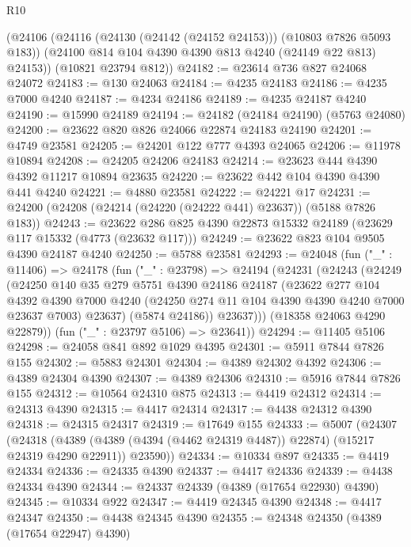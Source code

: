 \begin{lexlean}{R10}
\begin{coremodule}
      (@24106
        (@24116 (@24130 (@24142 (@24152 @24153))) (@10803 @7826 @5093 @183))
        (@24100 @814 @104 @4390 @4390 @813 @4240 (@24149 @22 @813) @24153))
      (@10821 @23794 @812))
@24182 := @23614 @736 @827 @24068 @24072
@24183 := @130 @24063
@24184 := @4235 @24183
@24186 := @4235 @7000 @4240
@24187 := @4234 @24186
@24189 := @4235 @24187 @4240
@24190 := @15990 @24189
@24194 := @24182 (@24184 @24190) (@5763 @24080)
@24200 := @23622 @820 @826 @24066 @22874 @24183 @24190
@24201 := @4749 @23581
@24205 := @24201 @122 @777 @4393 @24065
@24206 := @11978 @10894
@24208 := @24205 @24206 @24183
@24214 := @23623 @444 @4390 @4392 @11217 @10894 @23635
@24220 := @23622 @442 @104 @4390 @4390 @441 @4240
@24221 := @4880 @23581
@24222 := @24221 @17
@24231 := @24200 (@24208 (@24214 (@24220 (@24222 @441) @23637)) (@5188 @7826 @183))
@24243 := @23622 @286 @825 @4390 @22873 @15332 @24189 (@23629 @117 @15332 (@4773 (@23632 @117)))
@24249 := @23622 @823 @104 @9505 @4390 @24187 @4240
@24250 := @5788 @23581
@24293 := @24048
    (fun ("_" : @11406) =>
    @24178
      (fun ("_" : @23798) =>
      @24194
        (@24231
          (@24243
            (@24249
              (@24250
                @140
                @35
                @279
                @5751
                @4390
                @24186
                @24187
                (@23622
                  @277
                  @104
                  @4392
                  @4390
                  @7000
                  @4240
                  (@24250 @274 @11 @104 @4390 @4390 @4240 @7000 @23637 @7003)
                  @23637)
                (@5874 @24186))
              @23637)))
        (@18358 @24063 @4290 @22879))
      (fun ("_" : @23797 @5106) => @23641))
@24294 := @11405 @5106
@24298 := @24058 @841 @892 @1029 @4395
@24301 := @5911 @7844 @7826 @155
@24302 := @5883 @24301
@24304 := @4389 @24302 @4392
@24306 := @4389 @24304 @4390
@24307 := @4389 @24306
@24310 := @5916 @7844 @7826 @155
@24312 := @10564 @24310 @875
@24313 := @4419 @24312
@24314 := @24313 @4390
@24315 := @4417 @24314
@24317 := @4438 @24312 @4390
@24318 := @24315 @24317
@24319 := @17649 @155
@24333 := @5007
    (@24307
      (@24318
        (@4389 (@4389 (@4394 (@4462 @24319 @4487)) @22874) (@15217 @24319 @4290 @22911))
        @23590))
@24334 := @10334 @897
@24335 := @4419 @24334
@24336 := @24335 @4390
@24337 := @4417 @24336
@24339 := @4438 @24334 @4390
@24344 := @24337 @24339 (@4389 (@17654 @22930) @4390)
@24345 := @10334 @922
@24347 := @4419 @24345 @4390
@24348 := @4417 @24347
@24350 := @4438 @24345 @4390
@24355 := @24348 @24350 (@4389 (@17654 @22947) @4390)

\end{coremodule}
\end{lexlean}
